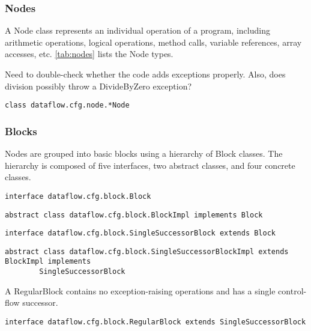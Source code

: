 \subsubsection{Nodes}
\label{sec:node_classes}

    A Node class represents an individual operation of a program, including arithmetic operations, logical operations, method calls, variable references, array accesses, etc.  \autoref{tab:nodes} lists the Node types.

\begin{workinprogress}
Need to double-check whether the code adds exceptions properly.  Also, does
division possibly throw a DivideByZero exception?
\end{workinprogress}


    \begin{verbatim}class dataflow.cfg.node.*Node\end{verbatim}

\subsubsection{Blocks}
\label{sec:block_classes}

    Nodes are grouped into basic blocks using a hierarchy of Block classes.  The hierarchy is composed of five interfaces, two abstract classes, and four concrete classes.  

             \begin{verbatim}interface dataflow.cfg.block.Block\end{verbatim}
    
              \begin{verbatim}abstract class dataflow.cfg.block.BlockImpl implements Block\end{verbatim}

              \begin{verbatim}interface dataflow.cfg.block.SingleSuccessorBlock extends Block\end{verbatim}

              \begin{verbatim}abstract class dataflow.cfg.block.SingleSuccessorBlockImpl extends BlockImpl implements
        SingleSuccessorBlock\end{verbatim}

    A RegularBlock contains no exception-raising operations and has a single control-flow successor.

    \begin{verbatim}interface dataflow.cfg.block.RegularBlock extends SingleSuccessorBlock\end{verbatim}
        
